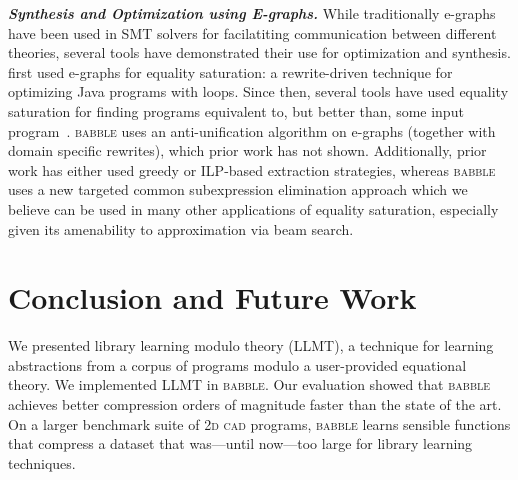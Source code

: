 \documentclass[acmsmall,screen,nonacm,review=false,timestamp=false]{acmart}
\newcommand{\emphbf}[1]{\emph{\textbf{#1}\xspace}}
\newcommand{\mypara}[1]{\smallskip\noindent\emphbf{#1.}\xspace}
\newcommand{\Egraphs}{E-graphs\xspace}
\newcommand{\egraphs}{e-graphs\xspace}
\newcommand{\tname}[1]{\textsc{#1}\xspace}
\newcommand{\tool}{\tname{babble}}
\newcommand{\cogsci}{\tname{2d cad}}
\begin{document}
\mypara{Synthesis and Optimization using \Egraphs}
While traditionally \egraphs have been used
  in SMT solvers for
  facilatiting communication between
  different theories,
  several tools have demonstrated
  their use for optimization
  and synthesis.
\citet{tate2009equality} first used \egraphs for
  equality saturation: a rewrite-driven technique
  for optimizing Java programs with loops.
Since then, several tools have used equality saturation
  for finding programs equivalent to,
  but better than, some
  input program~\cite{willsey2021egg, herbie, tensat, szalinski, diospyros, spores,
  cc1}.
\tool uses an anti-unification
  algorithm on \egraphs
  (together with domain specific
  rewrites), which prior work has not shown.
Additionally, prior work has either used
  greedy or ILP-based extraction strategies,
  whereas \tool uses a new targeted common
  subexpression elimination approach which
  we believe can be used in many other applications of
  equality saturation, especially given its
  amenability to approximation via beam search.


 \section{Conclusion and Future Work}

We presented library learning modulo theory (LLMT),
 a technique for learning abstractions from a corpus of programs
 modulo a user-provided equational theory.
We implemented LLMT in \tool.
Our evaluation showed that \tool
 achieves better compression orders of magnitude faster
 than the state of the art.
On a larger benchmark suite of \cogsci programs,
 \tool learns sensible functions that
 compress a dataset that was---until now---too large for library learning techniques.
\end{document}

